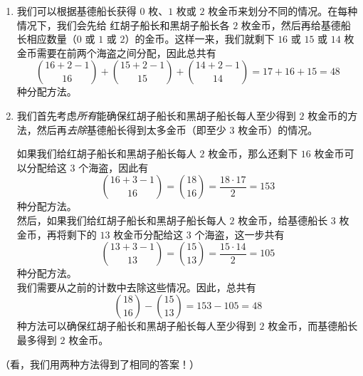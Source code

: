 \begin{example}
\begin{enumerate}[label=(\arabic*)]
\begin{enumerate}[label=(\roman*)]
                        \item 我们可以根据基德船长获得 $0$ 枚、$1$ 枚或 $2$ 枚金币来划分不同的情况。在每种情况下，我们会先给 红胡子船长和黑胡子船长各 $2$ 枚金币，然后再给基德船长相应数量（$0$ 或 $1$ 或 $2$）的金币。这样一来，我们就剩下 $16$ 或 $15$ 或 $14$ 枚金币需要在前两个海盗之间分配，因此总共有
                              \[{16+2-1 \choose 16}+{15+2-1 \choose 15}+{14+2-1 \choose 14}=17+16+15=48\]
                              种分配方法。
                        \item 我们首先考虑\emph{所有}能确保红胡子船长和黑胡子船长每人至少得到 $2$ 枚金币的方法，然后再\emph{去除}基德船长得到太多金币（即至少 $3$ 枚金币）的情况。

                              如果我们给红胡子船长和黑胡子船长每人 $2$ 枚金币，那么还剩下 $16$ 枚金币可以分配给这 $3$ 个海盗，因此有
                              \[{16+3-1 \choose 16}={18 \choose 16}=\frac{18 \cdot 17}{2}=153\]
                              种分配方法。\\

                              然后，如果我们给红胡子船长和黑胡子船长每人 $2$ 枚金币，给基德船长 $3$ 枚金币，再将剩下的 $13$ 枚金币分配给这 $3$ 个海盗，这一步共有
                              \[{13+3-1 \choose 13}={15 \choose 13}=\frac{15 \cdot 14}{2}=105\]
                              种分配方法。\\

                              我们需要从之前的计数中去除这些情况。因此，总共有
                              \[{18 \choose 16}-{15 \choose 13}=153 - 105 = 48\]
                              种方法可以确保红胡子船长和黑胡子船长每人至少得到 $2$ 枚金币，而基德船长最多得到 $2$ 枚金币。
                  \end{enumerate}
                  （看，我们用两种方法得到了相同的答案！）
      \end{enumerate}
\end{example}

